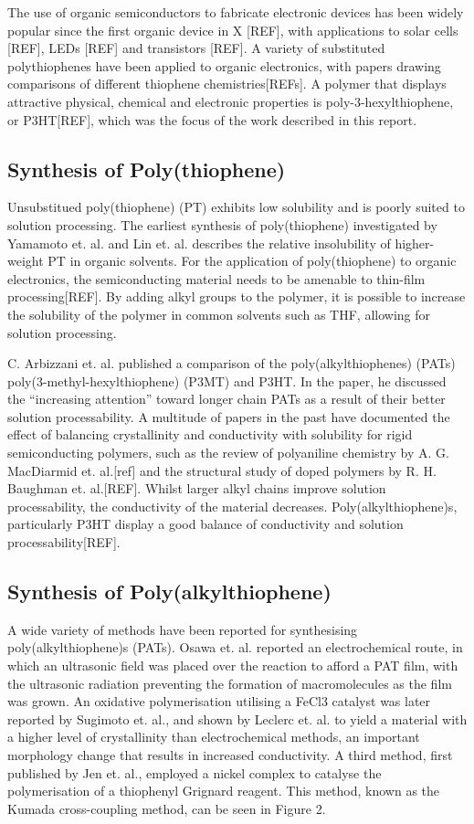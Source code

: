 The use of organic semiconductors to fabricate electronic devices has been widely popular since the first organic device in X [REF], with applications to solar cells [REF], LEDs [REF] and transistors [REF]. A variety of substituted polythiophenes have been applied to organic electronics, with papers drawing comparisons of different thiophene chemistries[REFs]. A polymer that displays attractive physical, chemical and electronic properties is poly-3-hexylthiophene, or P3HT[REF], which was the focus of the work described in this report. 

\subsection{Synthesis of Poly(thiophene)}

Unsubstitued poly(thiophene) (PT) exhibits low solubility and is poorly suited to solution processing. The earliest synthesis of poly(thiophene) investigated by Yamamoto et. al. and Lin et. al. describes the relative insolubility of higher-weight PT in organic solvents. For the application of poly(thiophene) to organic electronics, the semiconducting material needs to be amenable to thin-film processing[REF]. By adding alkyl groups to the polymer, it is possible to increase the solubility of the polymer in common solvents such as THF, allowing for solution processing.

C. Arbizzani et. al. published a comparison of the poly(alkylthiophenes) (PATs) poly(3-methyl-hexylthiophene) (P3MT) and P3HT. In the paper, he discussed the “increasing attention” toward longer chain PATs as a result of their better solution processability. A multitude of papers in the past have documented the effect of balancing crystallinity and conductivity with solubility for rigid semiconducting polymers, such as the review of polyaniline chemistry by A. G. MacDiarmid et. al.[ref] and the structural study of doped polymers by R. H. Baughman et. al.[REF]. Whilst larger alkyl chains improve solution processability, the conductivity of the material decreases. Poly(alkylthiophene)s, particularly P3HT display a good balance of conductivity and solution processability[REF].


\subsection{Synthesis of Poly(alkylthiophene)}

A wide variety of methods have been reported for synthesising poly(alkylthiophene)s (PATs). Osawa et. al. reported an electrochemical route, in which an ultrasonic field was placed over the reaction to afford a PAT film, with the ultrasonic radiation preventing the formation of macromolecules as the film was grown. An oxidative polymerisation utilising a FeCl3 catalyst was later reported by Sugimoto et. al., and shown by Leclerc et. al. to yield a material with a higher level of crystallinity than electrochemical methods, an important morphology change that results in increased conductivity. A third method, first published by Jen et. al., employed a nickel complex to catalyse the polymerisation of a thiophenyl Grignard reagent. This method, known as the Kumada cross-coupling method, can be seen in Figure 2. 

